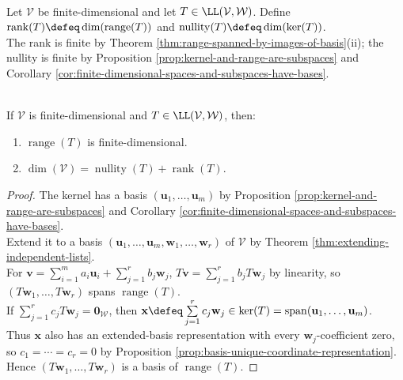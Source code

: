 \begin{definition} \label{def:rank-and-nullity-linear-map} \\
Let $\mathcal{V}$ be finite-dimensional and let $T\in\LL(\mathcal{V},\mathcal{W})$. Define $\operatorname{rank}(T)\defeq\dim(\operatorname{range}(T))$ and $\operatorname{nullity}(T)\defeq\dim(\ker(T))$.\\
The rank is finite by Theorem \ref{thm:range-spanned-by-images-of-basis}(ii); the nullity is finite by Proposition \ref{prop:kernel-and-range-are-subspaces} and Corollary \ref{cor:finite-dimensional-spaces-and-subspaces-have-bases}.
\end{definition}

\begin{theorem} \label{thm:rank-nullity} \\
If $\mathcal{V}$ is finite-dimensional and $T\in\LL(\mathcal{V},\mathcal{W})$, then:
\begin{enumerate}[label=(\roman*)]
\setlength{\itemsep}{0pt}
\item $\operatorname{range}(T)$ is finite-dimensional.
\item $\dim(\mathcal{V})=\operatorname{nullity}(T)+\operatorname{rank}(T)$.
\end{enumerate}
\begin{proof}
The kernel has a basis $(\mathbf{u}_1,\ldots,\mathbf{u}_m)$ by Proposition \ref{prop:kernel-and-range-are-subspaces} and Corollary \ref{cor:finite-dimensional-spaces-and-subspaces-have-bases}.\\
Extend it to a basis $(\mathbf{u}_1,\ldots,\mathbf{u}_m,\mathbf{w}_1,\ldots,\mathbf{w}_r)$ of $\mathcal{V}$ by Theorem \ref{thm:extending-independent-lists}.\\
For $\mathbf{v}=\sum\limits_{i=1}^m a_i\mathbf{u}_i+\sum\limits_{j=1}^r b_j\mathbf{w}_j$, $T\mathbf{v}=\sum\limits_{j=1}^r b_jT\mathbf{w}_j$ by linearity, so $(T\mathbf{w}_1,\ldots,T\mathbf{w}_r)$ spans $\operatorname{range}(T)$.\\
If $\sum\limits_{j=1}^r c_jT\mathbf{w}_j=\mathbf{0}_{\mathcal{W}}$, then $\mathbf{x}\defeq\sum\limits_{j=1}^r c_j\mathbf{w}_j\in\ker(T)=\operatorname{span}(\mathbf{u}_1,\ldots,\mathbf{u}_m)$.\\
Thus $\mathbf{x}$ also has an extended-basis representation with every $\mathbf{w}_j$-coefficient zero, so $c_1=\cdots=c_r=0$ by Proposition \ref{prop:basis-unique-coordinate-representation}.\\
Hence $(T\mathbf{w}_1,\ldots,T\mathbf{w}_r)$ is a basis of $\operatorname{range}(T)$.

\end{proof}
\end{theorem}

